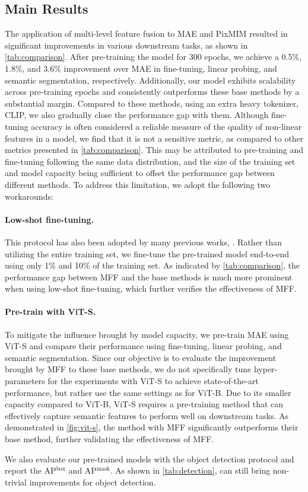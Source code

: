 \subsection{Main Results}
\label{sec:main_results}

The application of multi-level feature fusion to MAE \cite{MAE} and PixMIM \cite{pixmim} resulted in significant improvements in various downstream tasks, as shown in \autoref{tab:comparison}. After pre-training the model for 300 epochs, we achieve a 0.5\%, 1.8\%, and 3.6\% improvement over MAE in fine-tuning, linear probing, and semantic segmentation, respectively. Additionally, our model exhibits scalability across pre-training epochs and consistently outperforms these base methods by a substantial margin. Compared to these methods, using an extra heavy tokenizer, \eg CLIP, we also gradually close the performance gap with them. Although fine-tuning accuracy is often considered a reliable measure of the quality of non-linear features in a model, we find that it is not a sensitive metric, as compared to other metrics presented in \autoref{tab:comparison}. This may be attributed to pre-training and fine-tuning following the same data distribution, and the size of the training set and model capacity being sufficient to offset the performance gap between different methods. To address this limitation, we adopt the following two workarounds:

\paragraph{Low-shot fine-tuning.} This protocol has also been adopted by many previous works, \eg \cite{simclr}. Rather than utilizing the entire training set, we fine-tune the pre-trained model end-to-end using only 1\% and 10\% of the training set. As indicated by \autoref{tab:comparison}, the performance gap between MFF and the base methods is much more prominent when using low-shot fine-tuning, which further verifies the effectiveness of MFF.

\paragraph{Pre-train with ViT-S.} To mitigate the influence brought by model capacity, we pre-train MAE using ViT-S and compare their performance using fine-tuning, linear probing, and semantic segmentation. Since our objective is to evaluate the improvement brought by MFF to these base methods, we do not specifically tune hyper-parameters for the experiments with ViT-S to achieve state-of-the-art performance, but rather use the same settings as for ViT-B. Due to its smaller capacity compared to ViT-B, ViT-S requires a pre-training method that can effectively capture semantic features to perform well on downstream tasks. As demonstrated in \autoref{fig:vit-s}, the method with MFF significantly outperforms their base method, further validating the effectiveness of MFF.

We also evaluate our pre-trained models with the object detection protocol and report the AP$^\text{box}$ and AP$^\text{mask}$. As shown in \autoref{tab:detection}, \ourmethod can still bring non-trivial improvements for object detection.



